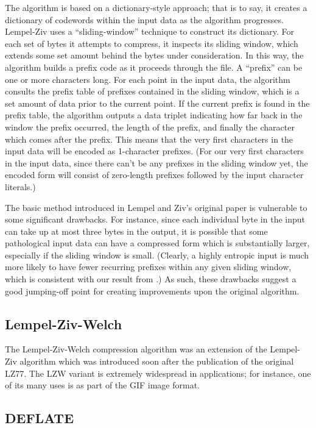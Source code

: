 \documentclass[12pt]{article}
\begin{document}
The algorithm is based on a dictionary-style approach; that is to say,
it creates a dictionary of codewords within the input data as the
algorithm progresses. Lempel-Ziv uses a ``sliding-window'' technique
to construct its dictionary. For each set of bytes it attempts to
compress, it inspects its sliding window, which extends some set
amount behind the bytes under consideration. In this way, the
algorithm builds a prefix code as it proceeds through the file. A
``prefix'' can be one or more characters long. For each point in the
input data, the algorithm consults the prefix table of prefixes
contained in the sliding window, which is a set amount of data prior
to the current point. If the current prefix is found in the prefix
table, the algorithm outputs a data triplet indicating how far back in
the window the prefix occurred, the length of the prefix, and finally
the character which comes after the prefix. This means that the very
first characters in the input data will be encoded as 1-character
prefixes. (For our very first characters in the input data, since
there can't be any prefixes in the sliding window yet, the encoded
form will consist of zero-length prefixes followed by the input
character literals.)

The basic method introduced in Lempel and Ziv's original paper is
vulnerable to some significant drawbacks. For instance, since each
individual byte in the input can take up at most three bytes in the
output, it is possible that some pathological input data can have a
compressed form which is substantially larger, especially if the
sliding window is small. (Clearly, a highly entropic input is much
more likely to have fewer recurring prefixes within any given sliding
window, which is consistent with our result from
.) As such, these drawbacks suggest a good
jumping-off point for creating improvements upon the original
algorithm.

\subsection{Lempel-Ziv-Welch}

The Lempel-Ziv-Welch compression algorithm was an extension of the
Lempel-Ziv algorithm which was introduced soon after the publication
of the original LZ77. \cite{LempelZivWelch} The LZW variant is
extremely widespread in applications; for instance, one of its many
uses is as part of the GIF image format.

\subsection{DEFLATE}
\end{document}
